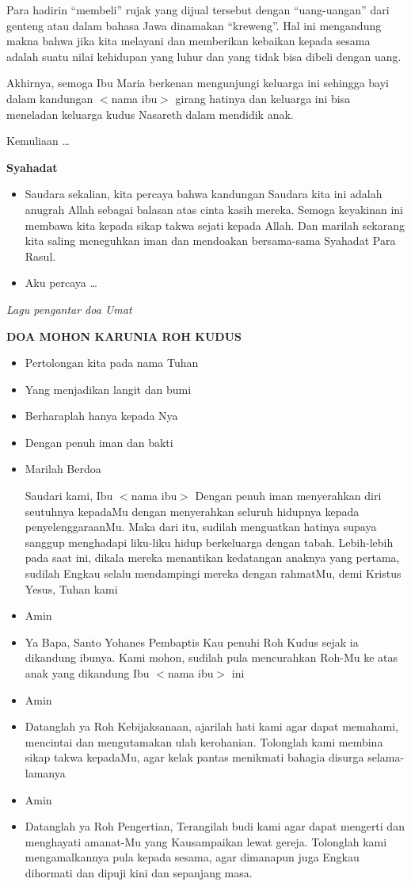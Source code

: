 \documentclass[a5paper,headsepline,titlepage,10pt,nnormalheadings,DIVcalc,twoside]{scrbook}
\makeatletter
\newcommand{\subjudul}[1]{%
  {\parindent \z@ 
    \interlinepenalty\@M \bfseries #1\par\nobreak \vskip 10\p@ }}
\newcommand{\lagu}[1]{%
  {\parindent \z@ 
    \interlinepenalty\@M \slshape \mdseries \Large \textit{#1}\par\nobreak \vskip 10\p@ }}
\newcommand{\BU}[1]{\begin{itemize} \item[U:] #1 \end{itemize}}
\newcommand{\BP}[1]{\begin{itemize} \item[P:] #1 \end{itemize}}
\newcommand{\namaibu}{$<$nama ibu$>$ }
\makeatother
\begin{document}
{Para hadirin “membeli” rujak yang dijual tersebut dengan “uang-uangan” dari genteng atau dalam bahasa Jawa dinamakan “kreweng”. Hal ini mengandung makna bahwa jika kita melayani dan memberikan kebaikan kepada sesama adalah suatu nilai kehidupan yang luhur dan yang tidak bisa dibeli dengan uang.

Akhirnya, semoga Ibu Maria berkenan mengunjungi keluarga ini sehingga bayi dalam kandungan \namaibu girang hatinya dan keluarga ini bisa meneladan keluarga kudus Nasareth dalam mendidik anak.

Kemuliaan \dots 
}


\subjudul{Syahadat} 
\BP{Saudara sekalian, kita percaya bahwa kandungan Saudara kita ini adalah anugrah Allah sebagai balasan atas cinta kasih mereka. Semoga keyakinan ini membawa kita kepada sikap takwa sejati kepada Allah. Dan marilah sekarang kita saling meneguhkan iman dan mendoakan bersama-sama Syahadat Para Rasul.}
\BU{Aku percaya \dots}

\lagu{Lagu pengantar doa Umat}


\subjudul{DOA MOHON KARUNIA ROH KUDUS}
\BP{Pertolongan kita pada nama Tuhan}
\BU{Yang menjadikan langit dan bumi}
\BP{Berharaplah hanya kepada Nya}
\BU{Dengan penuh iman dan bakti}

\BP{Marilah Berdoa

Saudari kami, Ibu \namaibu Dengan penuh iman menyerahkan diri seutuhnya kepadaMu dengan menyerahkan seluruh hidupnya kepada penyelenggaraanMu. Maka dari itu, sudilah menguatkan hatinya supaya sanggup menghadapi liku-liku hidup berkeluarga dengan tabah. Lebih-lebih pada saat ini, dikala mereka menantikan kedatangan anaknya yang pertama, sudilah Engkau selalu mendampingi mereka dengan rahmatMu, demi Kristus Yesus, Tuhan kami}

\BU{Amin}

\BP{Ya Bapa, Santo Yohanes Pembaptis Kau penuhi Roh Kudus sejak ia dikandung ibunya. Kami mohon, sudilah pula mencurahkan Roh-Mu ke atas anak yang dikandung Ibu \namaibu ini}

\BU{Amin}

\BP{Datanglah ya Roh Kebijaksanaan, ajarilah hati kami agar dapat memahami, mencintai dan mengutamakan ulah kerohanian. Tolonglah kami membina sikap takwa kepadaMu, agar kelak pantas menikmati bahagia disurga selama-lamanya}

\BU{Amin}

\BP{Datanglah ya Roh Pengertian, Terangilah budi kami agar dapat mengerti dan menghayati amanat-Mu yang Kausampaikan lewat gereja. Tolonglah kami mengamalkannya pula kepada sesama, agar dimanapun juga Engkau dihormati dan dipuji kini dan sepanjang masa.}
\end{document}

